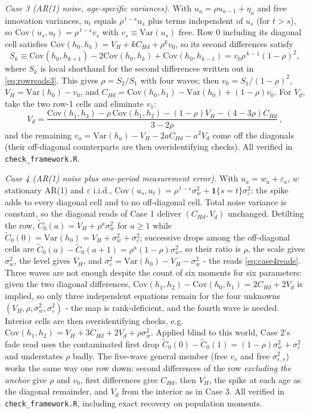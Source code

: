 \documentclass[11pt]{article}
\theoremstyle{remark}
\newcommand{\Var}{\mathrm{Var}}
\newcommand{\Cov}{\mathrm{Cov}}
\begin{document}
\emph{Case 3 (AR(1) noise, age-specific variances).} With $u_a=\rho u_{a-1}+\eta_a$ and free innovation variances, $u_t$ equals $\rho^{\,t-s}u_s$ plus terms independent of $u_s$ (for $t>s$), so $\Cov(u_s,u_t)=\rho^{\,t-s}v_s$ with $v_s\equiv\Var(u_s)$ free.
Row 0 including its diagonal cell satisfies $\Cov(h_0,h_k)=V_H+kC_{Hd}+\rho^k v_0$, so its second differences satisfy
\begin{equation}
S_k\equiv\Cov(h_0,h_{k+1})-2\Cov(h_0,h_k)+\Cov(h_0,h_{k-1})=v_0\rho^{\,k-1}(1-\rho)^2 ,
\end{equation}
where $S_k$ is local shorthand for the second differences written out in \eqref{eq:rowreads3}.
This gives $\rho=S_2/S_1$ with four waves; then $v_0=S_1/(1-\rho)^2$, $V_H=\Var(h_0)-v_0$, and $C_{Hd}=\Cov(h_0,h_1)-\Var(h_0)+(1-\rho)v_0$.
For $V_d$, take the two row-1 cells and eliminate $v_1$:
\begin{equation}
V_d=\frac{\Cov(h_1,h_3)-\rho\,\Cov(h_1,h_2)-(1-\rho)V_H-(4-3\rho)C_{Hd}}{3-2\rho}\,,
\end{equation}
and the remaining $v_a=\Var(h_a)-V_H-2aC_{Hd}-a^2V_d$ come off the diagonals (their off-diagonal counterparts are then overidentifying checks). All verified in \texttt{check\_framework.R}.

\emph{Case 4 (AR(1) noise plus one-period measurement error).} With $u_a=w_a+\varepsilon_a$, $w$ stationary AR(1) and $\varepsilon$ i.i.d., $\Cov(u_s,u_t)=\rho^{\,t-s}\sigma^2_w+\mathbf{1}\{s=t\}\sigma^2_\varepsilon$: the spike adds to every diagonal cell and to no off-diagonal cell.
Total noise variance is constant, so the diagonal reads of Case 1 deliver $(C_{Hd},V_d)$ unchanged.
Detilting the row, $\tilde C_0(a)=V_H+\rho^a\sigma^2_w$ for $a\ge1$ while $\tilde C_0(0)=\Var(h_0)=V_H+\sigma^2_w+\sigma^2_\varepsilon$; successive drops among the off-diagonal cells are $\tilde C_0(a)-\tilde C_0(a+1)=\rho^a(1-\rho)\sigma^2_w$, so their ratio is $\rho$, the scale gives $\sigma^2_w$, the level gives $V_H$, and $\sigma^2_\varepsilon=\Var(h_0)-V_H-\sigma^2_w$ - the reads \eqref{eq:case4reads}.
Three waves are not enough despite the count of six moments for six parameters: given the two diagonal differences, $\Cov(h_1,h_2)-\Cov(h_0,h_1)=2C_{Hd}+2V_d$ is implied, so only three independent equations remain for the four unknowns $(V_H,\rho,\sigma^2_w,\sigma^2_\varepsilon)$ - the map is rank-deficient, and the fourth wave is needed.
Interior cells are then overidentifying checks, e.g.\ $\Cov(h_1,h_2)=V_H+3C_{Hd}+2V_d+\rho\sigma^2_w$.
Applied blind to this world, Case 2's fade read uses the contaminated first drop $\tilde C_0(0)-\tilde C_0(1)=(1-\rho)\sigma^2_w+\sigma^2_\varepsilon$ and understates $\rho$ badly.
The five-wave general member (free $v_s$ and free $\sigma^2_{\varepsilon,s}$) works the same way one row down: second differences of the row \emph{excluding the anchor} give $\rho$ and $v_0$, first differences give $C_{Hd}$, then $V_H$, the spike at each age as the diagonal remainder, and $V_d$ from the interior as in Case 3.
All verified in \texttt{check\_framework.R}, including exact recovery on population moments.
\end{document}
